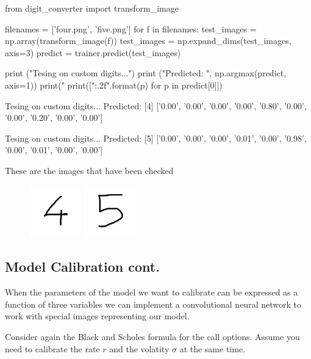 \begin{ipython}
from digit_converter import transform_image

filenames = ['four.png', 'five.png']
for f in filenames:
    test_images = np.array(transform_image(f))
test_images = np.expand_dims(test_images, axis=3)
predict = trainer.predict(test_images)

print ("Tesing on custom digits...")
print ("Predicted: ", np.argmax(predict, axis=1))
print("%
print(["{:.2f}".format(p) for p in predict[0]])
\end{ipython}
\begin{ioutput}
Tesing on custom digits...
Predicted:  [4]
['0.00', '0.00', '0.00', '0.00', '0.80', '0.00', '0.00', '0.20', '0.00', '0.00']

Tesing on custom digits...
Predicted:  [5]
['0.00', '0.00', '0.00', '0.01', '0.00', '0.98', '0.00', '0.01', '0.00', '0.00']
\end{ioutput}

These are the images that have been checked

\begin{figure}[htb]
	\centering
	\includegraphics[width=0.2\textwidth]{figures/four.png}
	\includegraphics[width=0.2\textwidth]{figures/five.png}
\end{figure}

\subsection{Model Calibration cont.}\label{model-calibration-cont.}

When the parameters of the model we want to calibrate can be expressed
as a function of three variables we can implement a convolutional neural network to work with special images representing our model.

Consider again the Black and Scholes formula for the call options.
Assume you need to calibrate the rate \(r\) and the volatity \(\sigma\)
at the same time.%

